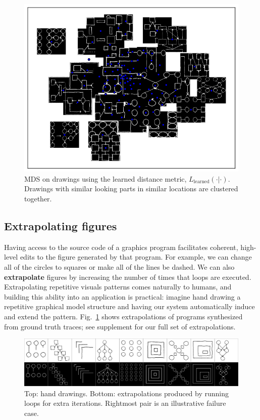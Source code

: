 \documentclass{article}
\begin{document}
\begin{figure}
\begin{minipage}{0.48\textwidth}
    \includegraphics[width = \textwidth]{figures/imageSimilarity.png} 
    \caption{MDS on drawings using the learned distance metric, $L_{\text{learned}}(\cdot|\cdot)$. Drawings with similar looking parts in similar locations are clustered together.}
  \end{minipage}
\end{figure}

\subsection{Extrapolating figures}
Having access to the source code of a graphics program facilitates coherent, high-level edits to the figure generated by that program. 
For example,
we can change all of the circles to squares or make all of the lines be dashed.
We can also \textbf{extrapolate} figures
by increasing the number of times that loops are executed.
Extrapolating repetitive visuals patterns comes naturally to humans,
and building this ability into an application is practical:
imagine hand drawing a repetitive graphical model structure
and having our system automatically induce and extend the pattern.
Fig.~\ref{extrapolationFigure} shows extrapolations of programs synthesized from ground truth traces;
see supplement for our full set of extrapolations.

\begin{figure}
  \includegraphics[width = \textwidth]{figures/extrapolationMatrix1.png}  
  \caption{Top: hand drawings. Bottom: extrapolations produced by
running loops for extra iterations. Rightmost pair is an illustrative failure case.}\label{extrapolationFigure}
  \end{figure}
%
\end{document}
